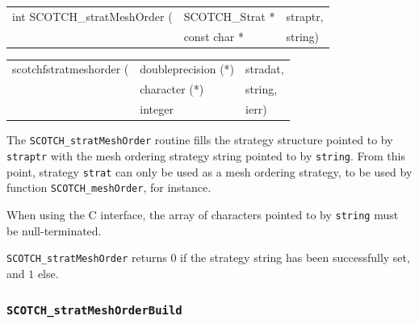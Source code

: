 \begin{itemize}
\progsyn

{\tt\begin{tabular}{l@{}ll}
int SCOTCH\_stratMeshOrder ( & SCOTCH\_Strat * & straptr, \\
                             & const char *    & string)
\end{tabular}}

{\tt\begin{tabular}{l@{}ll}
scotchfstratmeshorder ( & doubleprecision (*) & stradat, \\
                        & character (*)       & string,  \\
                        & integer             & ierr)
\end{tabular}}

\progdes

The {\tt SCOTCH\_stratMeshOrder} routine fills the strategy
structure pointed to by {\tt straptr} with the mesh ordering
strategy string pointed to by {\tt string}. From this point,
strategy {\tt strat} can only be used as a mesh ordering
strategy, to be used by function
{\tt SCOTCH\_\lbt mesh\lbt Order}, for instance.

When using the C interface, the array of characters pointed to by
{\tt string} must be null-terminated.

\progret

{\tt SCOTCH\_stratMeshOrder} returns $0$ if the strategy string
has been successfully set, and $1$ else.
\end{itemize}

\subsubsection{{\tt SCOTCH\_stratMeshOrderBuild}}

